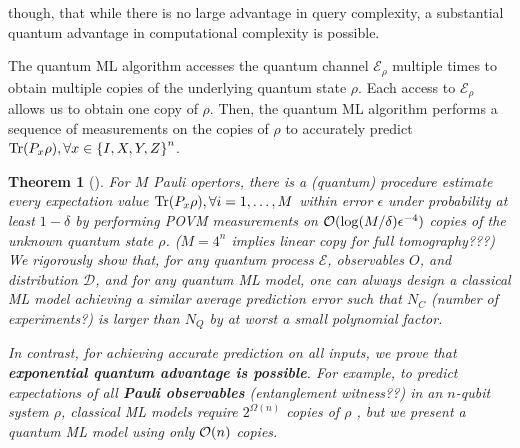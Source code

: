 \documentclass[
reprint,
aps,
pra,
floatfix,
]{revtex4-2}
\theoremstyle{plain}
\newtheorem{theorem}{Theorem}
\theoremstyle{definition}
\newcommand{\ob}{O}
\newcommand{\dm}{\rho}
\begin{document}
though, that while there is no large advantage in query complexity, a substantial quantum advantage in computational complexity is possible.

The quantum ML algorithm accesses the quantum channel $\mathcal{E}_\dm$ multiple times to obtain multiple copies of the underlying quantum state $\dm$. Each access to $\mathcal{E}_\dm$ allows us to obtain one copy of $\dm$. Then, the quantum ML algorithm performs a sequence of measurements on the copies of $\dm$ to accurately predict $\Tr(P_x \dm ), \forall x \in \qty{ I, X, Y, Z }^n$.

\begin{theorem}[\cite{huangInformationtheoreticBoundsQuantum2021}]\label{thm:quantum_ml_estimate_bound}
	For $M$ Pauli opertors, there is a (quantum) procedure estimate every expectation value $\Tr(P_x \dm),\forall i=1,\dots,M$ within error $\epsilon$ under probability at least $1-\delta $ by performing POVM measurements on $\mathcal{O}(\log(M/\delta)\epsilon^{-4})$ copies of the unknown quantum state $\dm$.
	($M=4^n$ implies linear copy for full tomography???)
	We rigorously show that, for any quantum process $\mathcal{E}$, observables $\ob$, and distribution $\mathcal{D}$, and for any quantum ML model, one can always design a classical ML model achieving a similar average prediction error such that $N_C$ (number of experiments?) is larger than $N_Q$ by at worst a small polynomial factor.

	In contrast, for achieving accurate prediction on all inputs, we prove that \textbf{exponential quantum advantage is possible}. For example, to predict expectations of all \textbf{Pauli observables} (entanglement witness??) in an $n$-qubit system $\dm$, classical ML models require $2^{\Omega(n)}$ copies of $\dm$ , but we present a quantum ML model using only $\mathcal{O}(n)$ copies.
\end{theorem}
\cite{huangPredictingManyProperties2020}
\cite{huangInformationtheoreticBoundsQuantum2021}
\cite{huangPowerDataQuantum2021}
\cite{aaronsonShadowTomographyQuantum2018}
\end{document}
